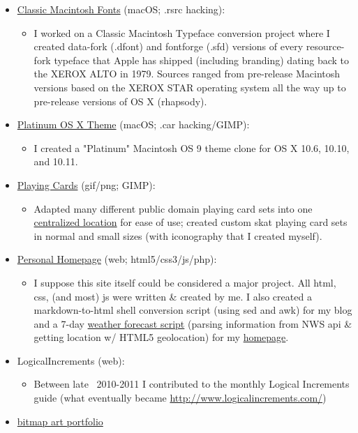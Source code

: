 \documentclass[11pt]{article}
\begin{document}
\begin{itemize}
\begin{itemize}
	\end{itemize}
	\item \href{https://github.com/JohnDDuncanIII/ClassicMacintoshFonts}{Classic Macintosh Fonts} (macOS; .rsrc hacking): 
	\begin{itemize}
	\item I worked on a Classic Macintosh Typeface conversion project where I created data-fork (.dfont) and fontforge (.sfd) versions of every resource-fork typeface that Apple has shipped (including branding) dating back to the XEROX ALTO in 1979. Sources ranged from pre-release Macintosh versions based on the XEROX STAR operating system all the way up to pre-release versions of OS X (rhapsody).
	\end{itemize}
	\item \href{https://github.com/JohnDDuncanIII/Platinum}{Platinum OS X Theme} (macOS; .car hacking/GIMP): 
	\begin{itemize}
	\item I created a "Platinum" Macintosh OS 9 theme clone for OS X 10.6, 10.10, and 10.11.
	\end{itemize}
	\item \href{https://github.com/JohnDDuncanIII/PlayingCards}{Playing Cards} (gif/png; GIMP): 
	\begin{itemize}
	\item Adapted many different public domain playing card sets into one \href{http://cs.gettysburg.edu/~duncjo01/PlayingCards/}{centralized location} for ease of use; created custom skat playing card sets in normal and small sizes (with iconography that I created myself).
	\end{itemize}
	\item \href{https://github.com/JohnDDuncanIII/JohnDDuncanIII.github.io}{Personal Homepage} (web; html5/css3/js/php): 
	\begin{itemize}
	\item I suppose this site itself could be considered a major project. All html, css, (and most) js were written \& created by me. I also created a markdown-to-html shell conversion script (using sed and awk) for my blog and a 7-day \href{http://cs.gettysburg.edu/~duncjo01/assets/scripts/weather.js}{weather forecast script} (parsing information from NWS api \& getting location w/ HTML5 geolocation) for my \href{http://cs.gettysburg.edu/~duncjo01/}{homepage}.
	\end{itemize}
	\item LogicalIncrements (web): 
	\begin{itemize}
	\item Between late ~2010-2011 I contributed to the monthly Logical Increments guide (what eventually became \url{http://www.logicalincrements.com/})
	\end{itemize}
	\item \href{http://cs.gettysburg.edu/~duncjo01/assets/portfolio.html}{bitmap art portfolio}
\end{itemize}
\end{document}
